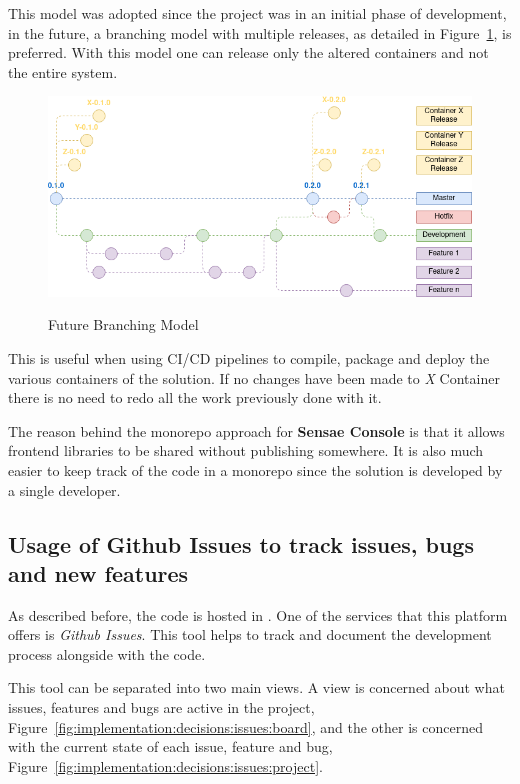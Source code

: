This model was adopted since the project was in an initial phase of development, in the future, a branching model with multiple releases, as detailed in Figure~\ref{fig:implementation:decisions:git:branch2}, is preferred. With this model one can release only the altered containers and not the entire system.

\begin{figure}[H]
    \centering
    \resizebox{\columnwidth}{!}
    {
       \includegraphics{assets/figures/branching-model-2.png}
    }
    \caption[Future Branching Model]{Future Branching Model}
    \label{fig:implementation:decisions:git:branch2}
\end{figure}

This is useful when using CI/CD pipelines to compile, package and deploy the various containers of the solution. If no changes have been made to \textit{X} Container there is no need to redo all the work previously done with it.

The reason behind the monorepo approach for \textbf{Sensae Console} is that it allows frontend libraries to be shared without publishing somewhere. It is also much easier to keep track of the code in a monorepo since the solution is developed by a single developer.

\subsection{Usage of Github Issues to track issues, bugs and new features}
\label{subsec:implementation:decisions:issues}

As described before, the code is hosted in . One of the services that this platform offers is \textit{Github Issues}. This tool helps to track and document the development process alongside with the code.

This tool can be separated into two main views. A view is concerned about what issues, features and bugs are active in the project, Figure~\ref{fig:implementation:decisions:issues:board}, and the other is concerned with the current state of each issue, feature and bug, Figure~\ref{fig:implementation:decisions:issues:project}.

